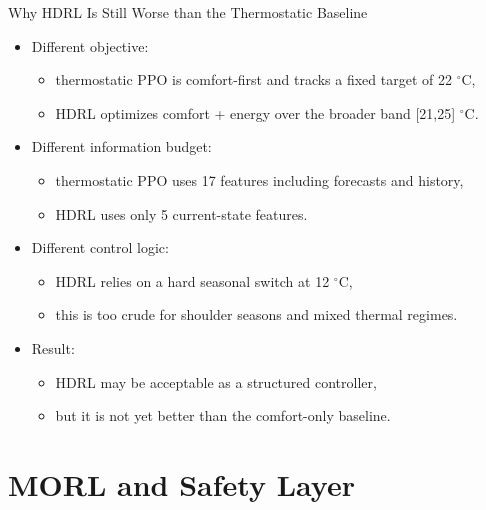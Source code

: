 \documentclass[aspectratio=169,11pt]{beamer}
\newcommand{\degc}{\ensuremath{^\circ\mathrm{C}}}
\begin{document}
\begin{frame}{Why HDRL Is Still Worse than the Thermostatic Baseline}
  \begin{itemize}
    \item Different objective:
    \begin{itemize}
      \item thermostatic PPO is comfort-first and tracks a fixed target of 22 \degc{},
      \item HDRL optimizes comfort + energy over the broader band [21,25] \degc{}.
    \end{itemize}
    \item Different information budget:
    \begin{itemize}
      \item thermostatic PPO uses 17 features including forecasts and history,
      \item HDRL uses only 5 current-state features.
    \end{itemize}
    \item Different control logic:
    \begin{itemize}
      \item HDRL relies on a hard seasonal switch at 12 \degc{},
      \item this is too crude for shoulder seasons and mixed thermal regimes.
    \end{itemize}
    \item Result:
    \begin{itemize}
      \item HDRL may be acceptable as a structured controller,
      \item but it is not yet better than the comfort-only baseline.
    \end{itemize}
  \end{itemize}
\end{frame}

\section{MORL and Safety Layer}
\end{document}
